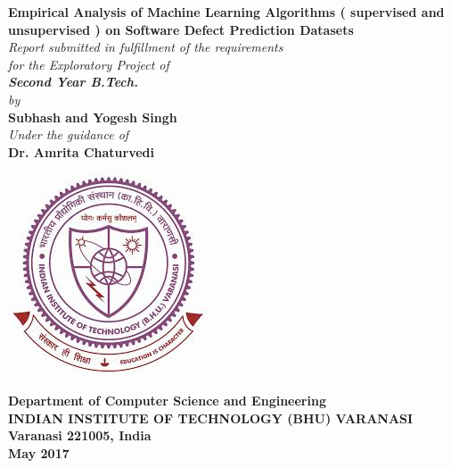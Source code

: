\begin{titlepage}
\thispagestyle{empty}
\mbox{}
\begin{center}

\textheight 15.5in \textwidth 12.5in {\small \bf Empirical Analysis of Machine Learning Algorithms ( supervised and unsupervised ) on Software Defect Prediction Datasets}\\[9ex]
\emph{Report submitted in fulfillment of the requirements\\
for the Exploratory Project of\\
[2ex]\large \bf Second Year B.Tech.
}\\
[2ex] \emph{by} \\[2ex]
{\large\sf \bf Subhash and Yogesh Singh}\\ [7ex] 
\emph{Under the guidance of}\\[1ex]
{\large \sf \bf Dr. Amrita Chaturvedi} \\[7ex]

\vspace{.05in}
\begin{center}
 \includegraphics[scale=.7,keepaspectratio=true]{./logo.jpeg}
\end{center}
% 

\vspace{1cm}
{\small  \bf Department of Computer Science and Engineering}  \\[1ex]
{\small \bf{INDIAN INSTITUTE OF TECHNOLOGY (BHU) VARANASI \\
Varanasi 221005, India\\
  May 2017}}

\end{center}
\end{titlepage}
